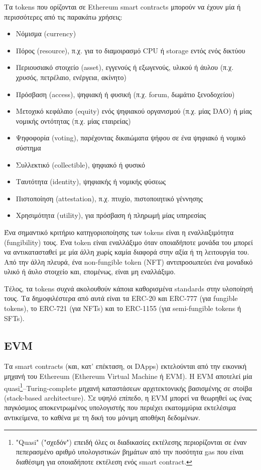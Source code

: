 Τα tokens που ορίζονται σε Ethereum smart contracts μπορούν να έχουν μία ή περισσότερες από τις παρακάτω χρήσεις:

\begin{itemize}
	\item Νόμισμα (currency)
	\item Πόρος (resource), π.χ. για το διαμοιρασμό CPU ή storage εντός ενός δικτύου
	\item Περιουσιακό στοιχείο (asset), εγγενούς ή εξωγενούς, υλικού
ή άυλου (π.χ. χρυσός, πετρέλαιο, ενέργεια, ακίνητο)
	\item Πρόσβαση (access), ψηφιακή ή
φυσική (π.χ. forum, δωμάτιο ξενοδοχείου)
	\item Μετοχικό κεφάλαιο (equity) ενός ψηφιακού οργανισμού (π.χ. μίας DAO) ή μίας νομικής οντότητας (π.χ. μίας εταιρείας)
	\item Ψηφοφορία (voting), παρέχοντας δικαιώματα ψήφου σε ένα ψηφιακό ή νομικό σύστημα
	\item Συλλεκτικό (collectible), ψηφιακό ή φυσικό
	\item Ταυτότητα (identity), ψηφιακής ή νομικής φύσεως
	\item Πιστοποίηση (attestation), π.χ. πτυχίο, πιστοποιητικό γέννησης
	\item Χρησιμότητα (utility), για πρόσβαση ή πληρωμή μίας υπηρεσίας
\end{itemize}

Ένα σημαντικό κριτήριο κατηγοριοποίησης των tokens είναι η εναλλαξιμότητα (fungibility) τους. Ένα token είναι εναλλάξιμο όταν οποιαδήποτε μονάδα του μπορεί να αντικατασταθεί με μία άλλη χωρίς καμία διαφορά στην αξία ή τη λειτουργία του. Από την άλλη πλευρά, ένα non-fungible token (NFT) αντιπροσωπεύει ένα μοναδικό υλικό ή άυλο στοιχείο και, επομένως, είναι μη εναλλάξιμο.

Τέλος, τα tokens συχνά ακολουθούν κάποια καθορισμένα standards στην υλοποίησή τους. Τα δημοφιλέστερα από αυτά είναι τα ERC-20 και ERC-777 (για fungible tokens), το ERC-721 (για NFTs) και το ERC-1155 (για semi-fungible tokens ή SFTs).

\subsection{EVM} \label{subsection:2-6-5-evm}
Τα smart contracts (και, κατ' επέκταση, οι DApps) εκτελούνται από την εικονική μηχανή του Ethereum (Ethereum Virtual Machine ή EVM). Η EVM αποτελεί μία quasi\footnote{"Quasi" ("σχεδόν") επειδή όλες οι διαδικασίες εκτέλεσης περιορίζονται σε έναν πεπερασμένο αριθμό υπολογιστικών βημάτων από την ποσότητα gas που είναι διαθέσιμη για οποιαδήποτε εκτέλεση ενός smart contract.}–Turing-complete μηχανή καταστάσεων αρχιτεκτονικής βασισμένης σε στοίβα (stack-based architecture). Σε υψηλό επίπεδο, η EVM μπορεί να θεωρηθεί ως ένας παγκόσμιος αποκεντρωμένος υπολογιστής που περιέχει εκατομμύρια εκτελέσιμα αντικείμενα, το καθένα με τη δική του μόνιμη αποθήκη δεδομένων.


